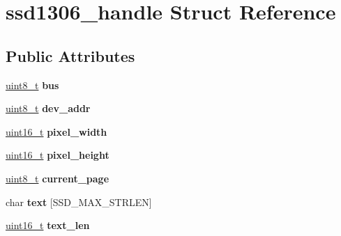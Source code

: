 \hypertarget{structssd1306__handle}{}\section{ssd1306\+\_\+handle Struct Reference}
\label{structssd1306__handle}
\subsection*{Public Attributes}
\begin{DoxyCompactItemize}
\item 
\mbox{\label{structssd1306__handle_afd785b447779c6886dedcf4e330711e9}} 
\hyperlink{vl53l0x__types_8h_aba7bc1797add20fe3efdf37ced1182c5}{uint8\+\_\+t} {\bfseries bus}
\item 
\mbox{\label{structssd1306__handle_a83a760e0804a4adb109b229c1f7d9378}} 
\hyperlink{vl53l0x__types_8h_aba7bc1797add20fe3efdf37ced1182c5}{uint8\+\_\+t} {\bfseries dev\+\_\+addr}
\item 
\mbox{\label{structssd1306__handle_aca44aad8cf6f7cb43c8159235cdfcc4f}} 
\hyperlink{vl53l0x__types_8h_a273cf69d639a59973b6019625df33e30}{uint16\+\_\+t} {\bfseries pixel\+\_\+width}
\item 
\mbox{\label{structssd1306__handle_ae2db43163af0355b4b2aadda31bd63c9}} 
\hyperlink{vl53l0x__types_8h_a273cf69d639a59973b6019625df33e30}{uint16\+\_\+t} {\bfseries pixel\+\_\+height}
\item 
\mbox{\label{structssd1306__handle_aa56de185167e9baedba382dce09d54d6}} 
\hyperlink{vl53l0x__types_8h_aba7bc1797add20fe3efdf37ced1182c5}{uint8\+\_\+t} {\bfseries current\+\_\+page}
\item 
\mbox{\label{structssd1306__handle_ae35c72bfb567589ced15cf1ae71fe8e2}} 
char {\bfseries text} \mbox{[}S\+S\+D\+\_\+\+M\+A\+X\+\_\+\+S\+T\+R\+L\+EN\mbox{]}
\item 
\mbox{\label{structssd1306__handle_ac68325b273962b629ef12aa9ec066848}} 
\hyperlink{vl53l0x__types_8h_a273cf69d639a59973b6019625df33e30}{uint16\+\_\+t} {\bfseries text\+\_\+len}

\end{DoxyCompactItemize}
